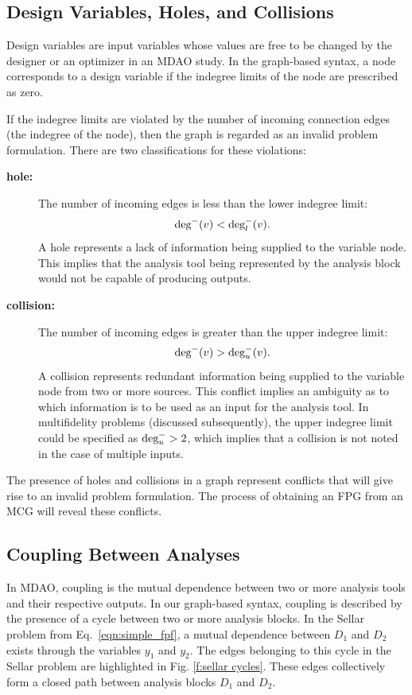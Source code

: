 \subsection{Design Variables, Holes, and Collisions}
  Design variables are input variables whose values are free to be 
  changed by the designer or an optimizer in an MDAO study. In the graph-based 
  syntax, a node corresponds to a design variable if the indegree limits of the node are 
  prescribed as zero.

  If the indegree limits are violated by the number of incoming connection edges 
  (the indegree of the node), then the graph is regarded as an invalid problem formulation. 
  There are two classifications for these violations:
    \begin{description}
      \item[\bf{hole:}] The number of incoming edges is less than the lower indegree limit:
        \begin{equation} 
          \textrm{deg}^-(v) < \textrm{deg}_l^-(v). 
          \label{e:hole} 
        \end{equation}
        A hole represents a lack of information being supplied to the variable node. 
        This implies that the analysis tool being represented by the analysis block 
        would not be capable of producing outputs.
      \item[\bf{collision:}] The number of incoming edges is greater than the upper 
      indegree limit:
        \begin{equation} 
        \textrm{deg}^-(v) > \textrm{deg}_u^-(v). 
        \label{e:collision}
        \end{equation}A collision represents redundant information being supplied to 
        the variable node from two or more sources. This conflict implies an 
        ambiguity as to which information is to be used as an input for the analysis tool.
	In multifidelity problems (discussed subsequently), the upper indegree limit could be 
  specified as $\textrm{deg}_u^- > 2$, which implies that a collision is not noted in the case of 
  multiple inputs.
  \end{description} 

  The presence of holes and collisions in a graph represent conflicts that will give
  rise to an invalid problem formulation. The process of obtaining an FPG from an 
  MCG will reveal these conflicts.

\subsection{Coupling Between Analyses}
  In MDAO, coupling is the mutual dependence between two or more analysis 
  tools and their respective outputs. In our graph-based syntax, coupling is 
  described by the presence of a cycle between two or more analysis blocks. In the Sellar 
  problem from Eq.~\ref{eqn:simple_fpf}, 
  a mutual dependence between $D_1$ and $D_2$ exists through the variables $y_1$ and $y_2$. 
  The edges belonging to this cycle in the Sellar problem are highlighted in 
  Fig. \ref{f:sellar cycles}.  These edges collectively form a closed path between 
  analysis blocks $D_1$ and $D_2$.

